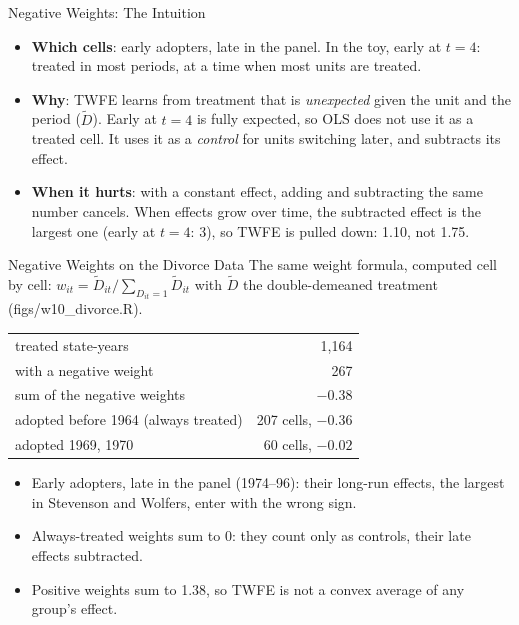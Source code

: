 \documentclass[aspectratio=169,11pt,xcolor=dvipsnames]{beamer}
\newcommand{\srcp}[1]{{\scriptsize\color{gray}(#1)}}
\newcommand{\adv}{\,\raisebox{0.6pt}{\textcolor{accent}{$\bigstar$}}}
\begin{document}
\begin{frame}{Negative Weights: The Intuition\adv}
\begin{itemize}\itemsep6pt
  \item \textbf{Which cells}: early adopters, late in the panel. In the toy, early at $t = 4$:
        treated in most periods, at a time when most units are treated.
  \item \textbf{Why}: TWFE learns from treatment that is \emph{unexpected} given the unit and the
        period ($\tilde D$). Early at $t = 4$ is fully expected, so OLS does not use it as a treated
        cell. It uses it as a \emph{control} for units switching later, and subtracts its effect.
  \item \textbf{When it hurts}: with a constant effect, adding and subtracting the same number
        cancels. When effects grow over time, the subtracted effect is the largest one
        (early at $t = 4$: 3), so TWFE is pulled down: 1.10, not 1.75.
\end{itemize}
\end{frame}

\begin{frame}{Negative Weights on the Divorce Data}
The same weight formula, computed cell by cell:
$w_{it} = \tilde D_{it}/\sum_{D_{it}=1}\tilde D_{it}$ with $\tilde D$ the
double-demeaned treatment \srcp{figs/w10\_divorce.R}.
\vskip4pt
\begin{center}\small
\renewcommand{\arraystretch}{1.05}
\begin{tabular}{@{}lr@{}}
\toprule
treated state-years & 1,164 \\
with a negative weight & 267 \\
sum of the negative weights & $-0.38$ \\
\midrule
\quad adopted before 1964 (always treated) & 207 cells, $-0.36$ \\
\quad adopted 1969, 1970 & 60 cells, $-0.02$ \\
\bottomrule
\end{tabular}
\end{center}
\vskip2pt
\begin{itemize}\itemsep3pt
  \item Early adopters, late in the panel (1974--96): their long-run effects, the largest in
        Stevenson and Wolfers, enter with the wrong sign.
  \item Always-treated weights sum to 0: they count only as controls, their late effects
        subtracted.
  \item Positive weights sum to 1.38, so TWFE is not a convex average of any
        group's effect.
\end{itemize}
\end{frame}
\end{document}
